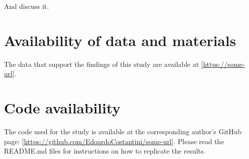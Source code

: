 \documentclass[a4paper,doc,floatsintext,natbib]{apa6}\usepackage[]{graphicx}\usepackage[]{xcolor}
\newcommand{\pathBIB}{./bib}
\begin{document}
	And discuss it.
    
    \setcounter{secnumdepth}{4}

    \section{Availability of data and materials}

    The data that support the findings of this study are available at [\url{https://some-url}].
    
    \section{Code availability}

    The code used for the study is available at the corresponding author's GitHub page: [\url{https://github.com/EdoardoCostantini/some-url}].
    Please read the README.md files for instructions on how to replicate the results.

    



\end{document}
